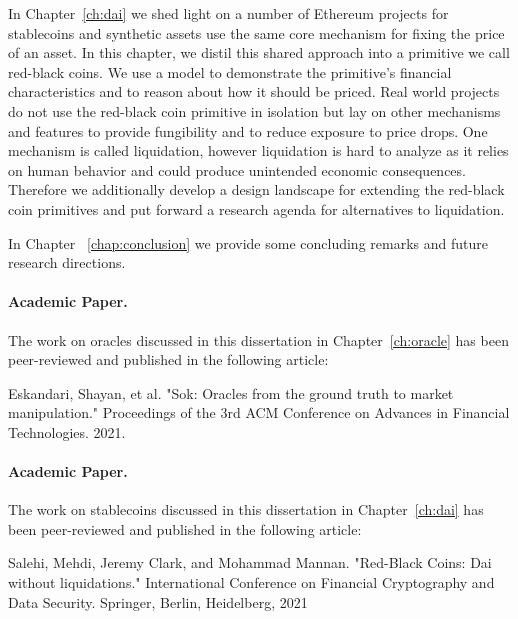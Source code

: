 In Chapter~\ref{ch:dai} we shed light on a number of Ethereum projects for stablecoins and synthetic assets use the same core mechanism for fixing the price of an asset. In this chapter, we distil this shared approach into a primitive we call red-black coins. We use a model to demonstrate the primitive's financial characteristics and to reason about how it should be priced. Real world projects do not use the red-black coin primitive in isolation but lay on other mechanisms and features to provide fungibility and to reduce exposure to price drops. One mechanism is called liquidation, however liquidation is hard to analyze as it relies on human behavior and could produce unintended economic consequences. Therefore we additionally develop a design landscape for extending the red-black coin primitives and put forward a research agenda for alternatives to liquidation.

In Chapter ~\ref{chap:conclusion} we provide some concluding remarks and future research directions.



\paragraph{Academic Paper. }The work on oracles discussed in this dissertation in Chapter~\ref{ch:oracle} has been peer-reviewed and published in the following article:

\begin{displayquote}
Eskandari, Shayan, et al. "Sok: Oracles from the ground truth to market manipulation." Proceedings of the 3rd ACM Conference on Advances in Financial Technologies. 2021.
\end{displayquote}

\paragraph{Academic Paper. }The work on stablecoins discussed in this dissertation in Chapter~\ref{ch:dai} has been peer-reviewed and published in the following article:

\begin{displayquote}
Salehi, Mehdi, Jeremy Clark, and Mohammad Mannan. "Red-Black Coins: Dai without liquidations." International Conference on Financial Cryptography and Data Security. Springer, Berlin, Heidelberg, 2021
\end{displayquote}